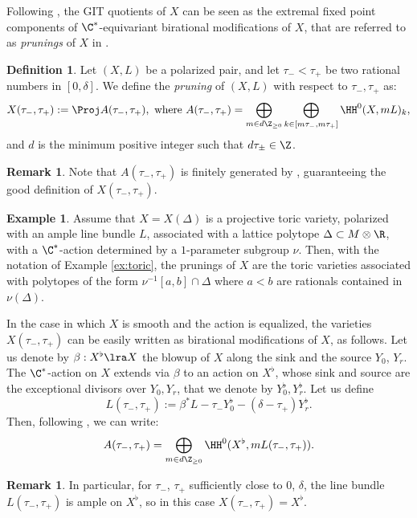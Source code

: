 \documentclass[reqno]{amsproc}
\theoremstyle{definition}
\newtheorem{definition}[theorem]{Definition}
\newtheorem{remark}[theorem]{Remark}
\newtheorem{example}[theorem]{Example}
\begin{document}
Following \cite{WORS3}, the GIT quotients of $X$ can be seen as the extremal fixed point components of $\C^*$-equivariant birational modifications of $X$, that are referred to as {\em prunings} of $X$ in \cite{BRUS}.

\begin{definition}\label{def:pruning}
Let $(X,L)$ be a polarized pair, and let $\tau_-<\tau_+$ be two rational numbers in $[0,\delta]$. We define the {\em pruning} of $(X,L)$ with respect to $\tau_-,\tau_+$ as: 
	$$
	X(\tau_-,\tau_+):=\Proj A(\tau_-,\tau_+),\ \mbox{where}\ A(\tau_-,\tau_+)=\bigoplus_{m\in d\Z_{\geq 0}}\bigoplus_{k \in[m\tau_-, m\tau_+]}\HH^0(X,mL)_k,
	$$	
and $d$ is the minimum positive integer such that $d\tau_\pm\in \Z$.
\end{definition}
	
\begin{remark}\label{rem:pruning} Note that $A(\tau_-,\tau_+)$ is finitely generated by \cite[Lemma 3.2]{BRUS}, guaranteeing the good definition of $X(\tau_-,\tau_+)$.  
\end{remark}

\begin{example}\label{ex:toric1}
Assume that $X=X(\Delta)$ is a projective toric variety, polarized with an ample line bundle $L$, associated with a lattice polytope $\Delta\subset M\otimes \R$,  with a $\C^*$-action determined by a $1$-parameter subgroup $\nu$. Then, with the notation of Example \ref{ex:toric}, the prunings of $X$ are the  toric varieties associated with polytopes of the form $\nu^{-1}[a,b]\cap\Delta$ where $a<b$ are rationals contained in $\nu(\Delta)$. 
\end{example}

In the case in which $X$ is smooth and the action is equalized, the varieties $X(\tau_-,\tau_+)$ can be easily written as birational modifications of $X$, as follows. Let us denote by $\beta:X^\flat\lra X$ the blowup of $X$ along the sink and the source $Y_0$, $Y_r$. The $\C^*$-action on $X$ extends via $\beta$ to an action on $X^\flat$, whose sink and source are the exceptional divisors over $Y_0,Y_r$, that we denote by $Y^\flat_0,Y^\flat_r$. Let us define
\[
L(\tau_-,\tau_+):=\beta^*L-\tau_-Y^\flat_0-(\delta-\tau_+)Y^\flat_r.
\]
Then, following \cite[Lemma 2.5]{WORS3}, we can write:
\[
A(\tau_-,\tau_+)=\bigoplus_{m\in d\Z_{\geq 0}}\HH^0(X^\flat,mL(\tau_-,\tau_+)).\]

\begin{remark}\label{rem:Xflat}
In particular, for $\tau_-$, $\tau_+$ sufficiently close to $0$, $\delta$, the line bundle $L(\tau_-,\tau_+)$ is ample on $X^\flat$, so in this case  $X(\tau_-,\tau_+)=X^\flat$. 
\end{remark}
\end{document}
